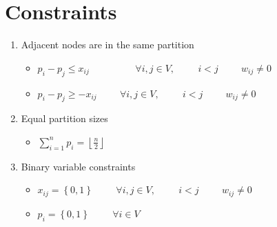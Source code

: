{\begin{center}
\end{center}

\section{Constraints}

\begin{enumerate}
    \item Adjacent nodes are in the same partition
    \begin{itemize}
        \item \(p_i - p_j \le x_{ij} \hspace{2cm} \forall i,j \in V,\hspace{1cm}i<j\hspace{1cm}w_{ij} \neq 0\)
        \item \(p_i - p_j \ge -  x_{ij} \hspace{1cm}\forall i,j \in V,\hspace{1cm}i<j\hspace{1cm}w_{ij} \neq 0\)
    \end{itemize}

    \item Equal partition sizes
    \begin{itemize}
        \item \(\displaystyle\sum_{i=1}^{n} p_i = \left \lfloor \frac{n}{2}  \right \rfloor\)
    \end{itemize}

    \item Binary variable constraints
    \begin{itemize}
        \item \(x_{ij} =\left\{ 0,1 \right\} \hspace{1cm}\forall i,j \in V,\hspace{1cm}i<j\hspace{1cm}w_{ij} \neq 0\)
        \item \(p_i =\left\{ 0,1 \right\} \hspace{1cm}\forall i \in V\)
    \end{itemize}
\end{enumerate}
}